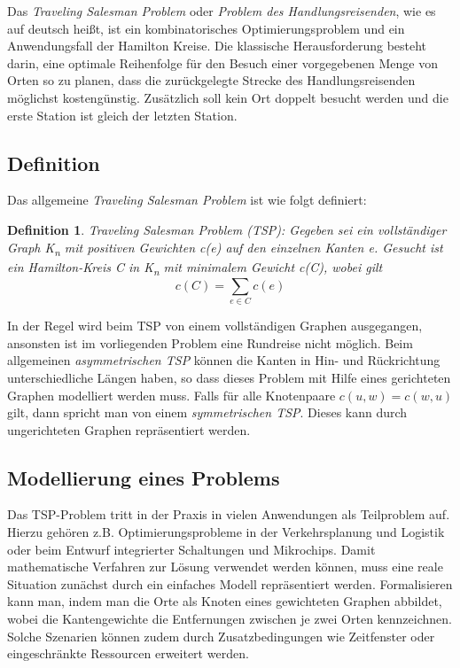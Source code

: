 \documentclass{article}
\newtheorem{mydef}{Definition}
\begin{document}
Das \textit{Traveling Salesman Problem} oder \textit{Problem des Handlungsreisenden}, wie es auf deutsch heißt, ist ein kombinatorisches Optimierungsproblem und ein Anwendungsfall der Hamilton Kreise. Die klassische Herausforderung besteht darin, eine optimale Reihenfolge für den Besuch einer vorgegebenen Menge von Orten so zu planen, dass die zurückgelegte Strecke des Handlungsreisenden möglichst kostengünstig. Zusätzlich soll kein Ort doppelt besucht werden und die erste Station ist gleich der letzten Station. 


\subsection{Definition}
Das allgemeine \textit{Traveling Salesman Problem} ist wie folgt definiert:
\begin{mydef}
	Traveling Salesman Problem (TSP): Gegeben sei ein vollständiger Graph K\textsubscript{n} mit positiven Gewichten \textit{c(e)} auf den einzelnen Kanten  \textit{e}. Gesucht ist ein Hamilton-Kreis \textit{C} in K\textsubscript{n} mit minimalem Gewicht c(C), wobei gilt
	\[c(C) =  \sum_{e \in C}  c(e) \]
\end{mydef}

In der Regel wird beim TSP von einem vollständigen Graphen ausgegangen, ansonsten ist im vorliegenden Problem eine Rundreise nicht möglich. Beim allgemeinen \textit{asymmetrischen TSP} können die Kanten in Hin- und Rückrichtung unterschiedliche Längen haben, so dass dieses Problem mit Hilfe eines gerichteten Graphen modelliert werden muss. Falls für alle Knotenpaare $c(u,w) = c(w,u)$ gilt, dann spricht man von einem \textit{symmetrischen TSP}. Dieses kann durch ungerichteten Graphen repräsentiert werden.

\subsection{Modellierung eines Problems}

Das TSP-Problem tritt in der Praxis in vielen Anwendungen als Teilproblem auf. Hierzu gehören z.B.
Optimierungsprobleme in der Verkehrsplanung und Logistik oder beim Entwurf integrierter Schaltungen
und Mikrochips. Damit mathematische Verfahren zur Lösung verwendet werden können, muss eine reale Situation zunächst durch ein einfaches Modell repräsentiert werden. Formalisieren kann man, indem man die Orte als Knoten eines gewichteten Graphen abbildet, wobei die Kantengewichte die
Entfernungen zwischen je zwei Orten kennzeichnen. Solche Szenarien können zudem durch Zusatzbedingungen wie Zeitfenster oder eingeschränkte Ressourcen erweitert werden.
\end{document}
